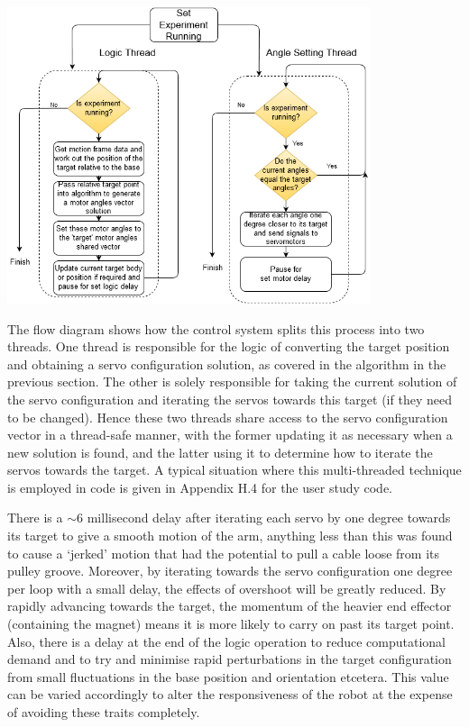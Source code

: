 \documentclass[11pt]{article}
\begin{document}
\begin{center}
\includegraphics[width=0.8\textwidth]{images/separateThreads2.png}
\label{figure:separateThreads}
\end{center}

The flow diagram shows how the control system splits this process into two threads. One thread is responsible for the logic of converting the target position and obtaining a servo configuration solution, as covered in the algorithm in the previous section. The other is solely responsible for taking the current solution of the servo configuration and iterating the servos towards this target (if they need to be changed). Hence these two threads share access to the servo configuration vector in a thread-safe manner, with the former updating it as necessary when a new solution is found, and the latter using it to determine how to iterate the servos towards the target. A typical situation where this multi-threaded technique is employed in code is given in Appendix H.4 for the user study code.

There is a $\sim$6 millisecond delay after iterating each servo by one degree towards its target to give a smooth motion of the arm, anything less than this was found to cause a `jerked' motion that had the potential to pull a cable loose from its pulley groove. Moreover, by iterating towards the servo configuration one degree per loop with a small delay, the effects of overshoot will be greatly reduced. By rapidly advancing towards the target, the momentum of the heavier end effector (containing the magnet) means it is more likely to carry on past its target point. Also, there is a delay at the end of the logic operation to reduce computational demand and to try and minimise rapid perturbations in the target configuration from small fluctuations in the base position and orientation etcetera. This value can be varied accordingly to alter the responsiveness of the robot at the expense of avoiding these traits completely. 
\end{document}
